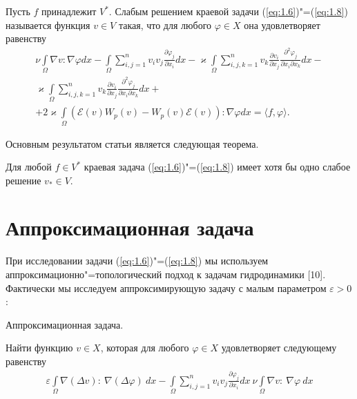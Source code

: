 \begin{definition}
    Пусть $f$ принадлежит $V^*$. Слабым решением краевой задачи (\ref{eq:1.6})"=(\ref{eq:1.8}) называется функция $v\in V$ такая,
    что для любого $\varphi \in X$ она удовлетворяет равенству
    \begin{equation}\label{eq:2.1}
        \begin{gathered}
            \nu\int\limits_{\Omega}\nabla v: \nabla \varphi dx-\int\limits_{\Omega} \sum_{i,j=1}^n v_iv_j\frac{\partial \varphi_j}
            {\partial x_i}dx-\varkappa\int\limits_{\Omega}\sum_{i,j,k=1}^n v_k\frac{\partial v_i}{\partial x_j}\frac{\partial^2 \varphi_j}{\partial x_i\partial x_k}dx- \\
            \varkappa\int\limits_{\Omega}\sum_{i,j,k=1}^n v_k\frac{\partial v_i}{\partial x_j}\frac{\partial^2 \varphi_j}
            {\partial x_i\partial x_k}dx+\\
            +2\varkappa\int\limits_{\Omega}(\mathcal{E}(v)W_p(v)-W_p(v)\mathcal{E}(v)):
            \nabla\varphi dx=\langle f,\varphi \rangle.
        \end{gathered}
    \end{equation}
\end{definition}
Основным результатом статьи является следующая теорема.

\begin{theorem}
    Для любой $f\in V^*$ краевая задача (\ref{eq:1.6})"=(\ref{eq:1.8}) имеет хотя бы одно слабое решение $v_*\in V$.
\end{theorem}

\section{Аппроксимационная задача}
При исследовании задачи (\ref{eq:1.6})"=(\ref{eq:1.8}) мы используем аппроксимационно"=топологический подход к задачам гидродинамики [10].
Фактически мы исследуем аппроксимирующую задачу с малым параметром $\varepsilon > 0$:

Аппроксимационная задача.

Найти функцию $v \in X$, которая для любого $\varphi \in X$ удовлетворяет следующему равенству
\begin{equation*}
    \begin{gathered}
        \varepsilon \int\limits_\Omega \nabla(\Delta v): \ \nabla(\Delta\varphi) \ dx -
        \int\limits_\Omega \sum_{i,j=1}^n v_i v_j \frac{\partial \varphi_j}{\partial x_i} dx \ \nu
        \int\limits_\Omega \nabla v: \ \nabla \varphi \ dx
    \end{gathered}
\end{equation*}

